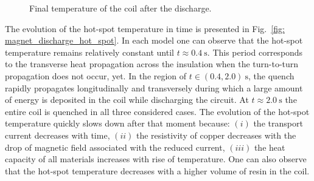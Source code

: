 \begin{figure}[H]
    \centering
    \caption{Final temperature of the coil after the discharge.}
    \label{fig: magnet_discharge_final_temperature}
\end{figure}

The evolution of the hot-spot temperature in time is presented in Fig.~\ref{fig: magnet_discharge_hot_spot}. In each model one can observe that the hot-spot temperature remains relatively constant until $t \approx 0.4~\text{s}$. This period corresponds to the transverse heat propagation across the insulation when the turn-to-turn propagation does not occur, yet. In the region of $t \in (0.4, 2.0)~\text{s}$, the quench rapidly propagates longitudinally and transversely during which a large amount of energy is deposited in the coil while discharging the circuit. At $t \approx 2.0~\text{s}$ the entire coil is quenched in all three considered cases. The evolution of the hot-spot temperature quickly slows down  after that moment because: $(i)$ the transport current decreases with time, $(ii)$ the resistivity of copper decreases with the drop of magnetic field associated with the reduced current, $(iii)$ the heat capacity of all materials increases with rise of temperature. One can also observe that the hot-spot temperature decreases with a higher volume of resin in the coil. 

